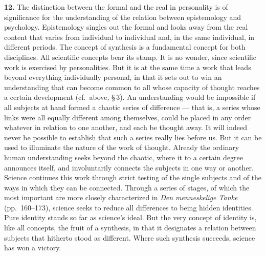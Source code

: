 \documentclass[12pt]{book}
\newcommand{\hnum}[1]{\textbf{#1.}\enspace}
\newcommand{\opage}[1]{\marginnote{\footnotesize\textit{[#1]}}}
\begin{document}
\hnum{12} The distinction between the formal and the real in personality is of significance for the
understanding of the relation between epistemology and psychology. Epistemology \opage{41}singles out the
formal and looks away from the real content that varies from individual to individual and, in the
same individual, in different periods. The concept of synthesis is a fundamental concept for both
disciplines. All scientific concepts bear its stamp. It is no wonder, since scientific work is
exercised by personalities. But it is at the same time a work that leads beyond everything
individually personal, in that it sets out to win an understanding that can become common to all
whose capacity of thought reaches a certain development (cf.\ above, \S\,3). An understanding would
be impossible if all subjects at hand formed a chaotic series of difference --- that is, a series
whose links were all equally different among themselves, could be placed in any order whatever in
relation to one another, and each be thought away. It will indeed never be possible to establish that
such a series really lies before us. But it can be used to illuminate the nature of the work of
thought. Already the ordinary human understanding seeks beyond the chaotic, where it to a certain
degree announces itself, and involuntarily connects the subjects in one way or another. Science
continues this work through strict testing of the single subjects and of the ways in which they can
be connected. Through a series of stages, of which the most important are more closely characterized
in \textit{Den menneskelige Tanke} (pp.\ 160--173), science seeks to reduce all differences to being
hidden identities. Pure identity stands so far as science's ideal. But the very concept of identity
is, like all concepts, the fruit of a synthesis, in that it designates a relation between subjects
that hitherto stood as different. Where such synthesis succeeds, science has won a victory.
\end{document}
